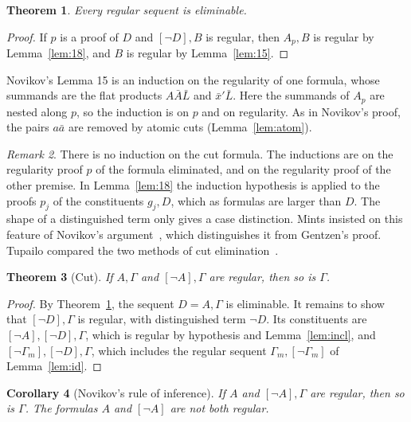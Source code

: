 \documentclass[11pt]{amsart}
\newtheorem{theorem}{Theorem}[section]
\newtheorem{corollary}[theorem]{Corollary}
\theoremstyle{definition}
\theoremstyle{remark}
\newtheorem{remark}[theorem]{Remark}
\newcommand{\one}[1]{[#1]}
\begin{document}
\begin{theorem}\label{thm:novikov}
  Every regular sequent is eliminable.
\end{theorem}

\begin{proof}
  If $p$ is a proof of $D$ and $\one{\neg D},B$ is regular, then $A_p,B$
  is regular by Lemma~\ref{lem:18}, and $B$ is regular by
  Lemma~\ref{lem:15}.
\end{proof}

Novikov's Lemma 15 is an induction on the regularity of one formula, whose
summands are the flat products $A\bar A\bar L$ and $\bar x'\bar L$. Here
the summands of $A_p$ are nested along $p$, so the induction is on $p$
and on regularity. As in Novikov's proof, the pairs $a\bar a$ are removed
by atomic cuts (Lemma~\ref{lem:atom}).

\begin{remark}\label{rem:nocut}
  There is no induction on the cut formula. The inductions are on the
  regularity proof $p$ of the formula eliminated, and on the regularity
  proof of the other premise. In Lemma~\ref{lem:18} the induction
  hypothesis is applied to the proofs $p_j$ of the constituents $g_j,D$,
  which as formulas are larger than $D$. The shape of a distinguished
  term only gives a case distinction. Mints insisted on this feature of
  Novikov's argument~\cite{Mints}, which distinguishes it from Gentzen's
  proof. Tupailo compared the two methods of cut
  elimination~\cite{Tupailo}.
\end{remark}

\begin{theorem}[Cut]\label{thm:cut}
  If $A,\Gamma$ and $\one{\neg A},\Gamma$ are regular, then so is
  $\Gamma$.
\end{theorem}

\begin{proof}
  By Theorem~\ref{thm:novikov}, the sequent $D=A,\Gamma$ is eliminable.
  It remains to show that $\one{\neg D},\Gamma$ is regular, with
  distinguished term $\neg D$. Its constituents are
  $\one{\neg A},\one{\neg D},\Gamma$, which is regular by hypothesis and
  Lemma~\ref{lem:incl}, and $\one{\neg\Gamma_m},\one{\neg D},\Gamma$,
  which includes the regular sequent $\Gamma_m,\one{\neg\Gamma_m}$ of
  Lemma~\ref{lem:id}.
\end{proof}

\begin{corollary}[Novikov's rule of inference]
  If $A$ and $\one{\neg A},\Gamma$ are regular, then so is $\Gamma$. The
  formulas $A$ and $\one{\neg A}$ are not both regular.
\end{corollary}
\end{document}
